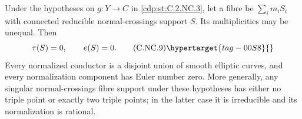 \begin{proposition}\hypertarget{tag-01CB}{}\label{cdp:st:C.2.NC.4}

Under the hypotheses on $g:Y\to C$ in \ref{cdp:st:C.2.NC.3}, let a fibre be $\sum_i m_iS_i$ with connected reducible normal-crossings support $S$. Its multiplicities may be unequal. Then
\[
 \tau(S)=0,\qquad e(S)=0.
 \tag{C.NC.9}\hypertarget{tag-00S8}{}\label{cdp:eq:C.NC.9}
\]
Every normalized conductor is a disjoint union of smooth elliptic curves, and every normalization component has Euler number zero. More generally, any singular normal-crossings fibre support under these hypotheses has either no triple point or exactly two triple points; in the latter case it is irreducible and its normalization is rational.
\end{proposition}


